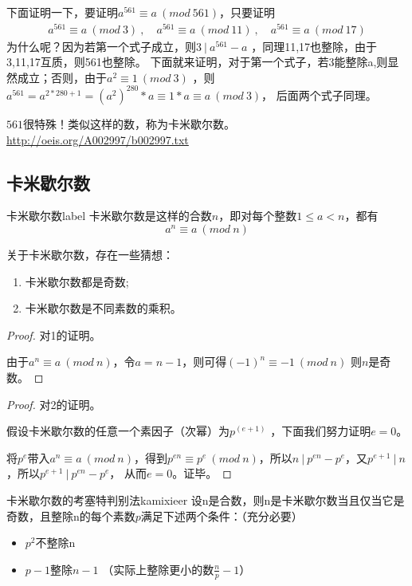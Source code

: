 下面证明一下，要证明$a^{561}\equiv a\  (mod \ 561)$，只要证明
\begin{align*}
a^{561}\equiv a\  (mod  \ 3) \ ,\quad a^{561}\equiv a\  (mod  \ 11) \  ,\quad  a^{561}\equiv a\  (mod  \ 17)
\end{align*}
为什么呢？因为若第一个式子成立，则$3 \ |\  a^{561}-a$  ，同理11,17也整除，由于3,11,17互质，则561也整除。
下面就来证明，对于第一个式子，若3能整除a,则显然成立；否则，由于$a^2\equiv 1\ (mod \ 3)$  ，则$a^{561}=a^{2*280+1}=(a^2)^{280}*a\equiv 1*a \equiv  a  \ (mod \ 3)$，
后面两个式子同理。

$561$很特殊！类似这样的数，称为卡米歇尔数。\href{http://oeis.org/A002997/b002997.txt}{http://oeis.org/A002997/b002997.txt}

\subsection{卡米歇尔数}

\begin{definition}{卡米歇尔数}{label}
	卡米歇尔数是这样的合数$n$，即对每个整数$1\le a < n$，都有
	$$
		a^n \equiv a \ (mod \ n)
	$$
\end{definition}

关于卡米歇尔数，存在一些猜想：

{\heiti
\begin{enumerate}
	\item 卡米歇尔数都是奇数;
	\item 卡米歇尔数是不同素数的乘积。
\end{enumerate}
}

\begin{proof}
	对1的证明。
	
	由于$a^n\equiv a \ (mod \ n)$，令$a=n-1$，则可得$(-1)^n\equiv -1 \ (mod \ n)$  则$n$是奇数。
\end{proof}

\begin{proof}
	对2的证明。
	
	假设卡米歇尔数的任意一个素因子（次幂）为$p^{(e+1)}$ ，下面我们努力证明$e=0$。
	
	将$p^e$带入$a^n\equiv a \ (mod \ n)$，得到$p^{en}\equiv p^e \ (mod \ n)$，所以$n \ | \ p^{en}-p^e$，又$p^{e+1} \ | \ n$，所以$p^{e+1} \ | \ p^{en}-p^e$，
	从而$e=0$。证毕。
\end{proof}


\begin{theorem}{卡米歇尔数的考塞特判别法}{kamixieer}
	设n是合数，则n是卡米歇尔数当且仅当它是奇数，且整除n的每个素数$p$满足下述两个条件：（充分必要）
	\begin{itemize}
		\item $p^2 $不整除n
		\item $p-1$整除$n-1$ （实际上整除更小的数$\frac{n}{p}-1$）
	\end{itemize}
\end{theorem}

